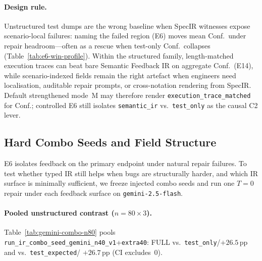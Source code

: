 \paragraph{Design rule.}
Unstructured test dumps are the wrong baseline when SpecIR witnesses expose
scenario-local failures: naming the failed region (E6) moves mean Conf.\ under
repair headroom---often as a rescue when test-only Conf.\ collapses
(Table~\ref{tab:e6-win-profile}).
Within the structured family, length-matched execution traces can beat bare
Semantic Feedback IR on aggregate Conf.\ (E14), while scenario-indexed fields
remain the right artefact when engineers need localisation, auditable repair
prompts, or cross-notation rendering from SpecIR.
Default strengthened mode~M may therefore render
\texttt{execution\_trace\_matched} for Conf.; controlled E6 still isolates
\texttt{semantic\_ir} vs.\ \texttt{test\_only} as the causal C2 lever.

\begin{table}[H]
  \caption{E14 length-matched feedback sweep ($n{=}120$ tasks per variant).}
  \label{tab:e14-feedback}
  \centering
\end{table}

\subsection{Hard Combo Seeds and Field Structure}
\label{sec:results:gemini-combo}

E6 isolates feedback on the primary endpoint under natural repair failures.
To test whether typed IR still helps when bugs are structurally harder, and
which IR surface is minimally sufficient, we freeze injected combo seeds and
run one $T{=}0$ repair under each feedback surface on
\texttt{gemini-2.5-flash}.

\paragraph{Pooled unstructured contrast ($n{=}80{\times}3$).}
Table~\ref{tab:gemini-combo-n80} pools
\texttt{run\_ir\_combo\_seed\_gemini\_n40\_v1}+\texttt{extra40}:
FULL vs.\ \texttt{test\_only}/${+}26.5$\,pp and vs.\ \texttt{test\_expected}/
${+}26.7$\,pp (CI excludes~0).

